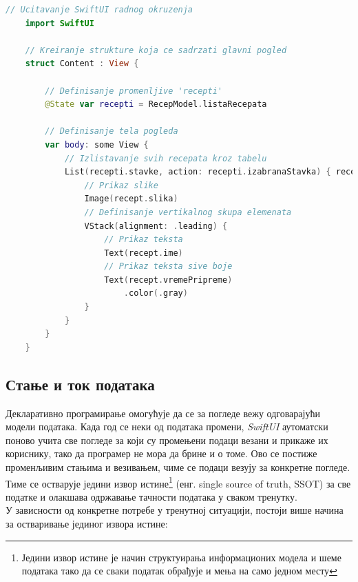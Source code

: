 \documentclass[12pt,oneside]{memoir}
\begin{document}
\begin{lstlisting}[caption=\textit{{Пример SwiftUI кода}}, label={lst:Пример SwiftUI кода}, language=Swift, frame=single]
    // Ucitavanje SwiftUI radnog okruzenja
    import SwiftUI
    
    // Kreiranje strukture koja ce sadrzati glavni pogled
    struct Content : View {
    
        // Definisanje promenljive 'recepti'
        @State var recepti = RecepModel.listaRecepata
        
        // Definisanje tela pogleda
        var body: some View {
            // Izlistavanje svih recepata kroz tabelu
            List(recepti.stavke, action: recepti.izabranaStavka) { recept in
                // Prikaz slike
                Image(recept.slika)
                // Definisanje vertikalnog skupa elemenata
                VStack(alignment: .leading) {
                    // Prikaz teksta
                    Text(recept.ime)
                    // Prikaz teksta sive boje
                    Text(recept.vremePripreme)
                        .color(.gray)
                }
            }
        } 
    }
\end{lstlisting}

\subsection{Стање и ток података}
\label{subsec:Стање и ток података}

\indent Декларативно програмирање омогућује да се за погледе вежу одговарајући модели података. Када год се неки од података промени, \textit{SwiftUI} аутоматски поново учита све погледе за који су промењени подаци везани и прикаже их кориснику, тако да програмер не мора да брине и о томе. Ово се постиже променљивим стањима и везивањем, чиме се подаци везују за конкретне погледе. Тиме се остварује једини извор истине\footnote{Једини извор истине је начин структуирања информационих модела и шеме података тако да се сваки податак обрађује и мења на само једном месту} (енг. single source of truth, SSOT) за све податке и олакшава одржавање тачности података у сваком тренутку. 
\\
\indent У зависности од конкретне потребе у тренутној ситуацији, постоји више начина за остваривање јединог извора истине:
\end{document}
